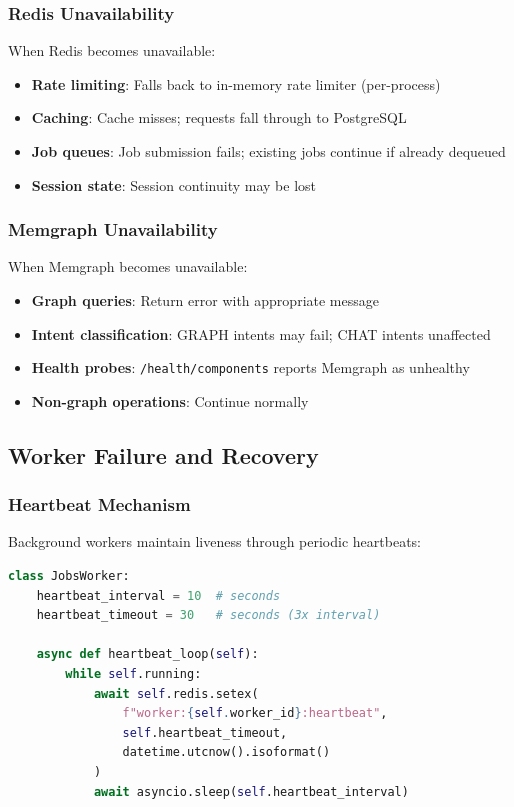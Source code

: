 \subsubsection{Redis Unavailability}

When Redis becomes unavailable:

\begin{itemize}
    \item \textbf{Rate limiting}: Falls back to in-memory rate limiter (per-process)
    \item \textbf{Caching}: Cache misses; requests fall through to PostgreSQL
    \item \textbf{Job queues}: Job submission fails; existing jobs continue if already dequeued
    \item \textbf{Session state}: Session continuity may be lost
\end{itemize}

\subsubsection{Memgraph Unavailability}

When Memgraph becomes unavailable:

\begin{itemize}
    \item \textbf{Graph queries}: Return error with appropriate message
    \item \textbf{Intent classification}: GRAPH intents may fail; CHAT intents unaffected
    \item \textbf{Health probes}: \texttt{/health/components} reports Memgraph as unhealthy
    \item \textbf{Non-graph operations}: Continue normally
\end{itemize}

\subsection{Worker Failure and Recovery}

\subsubsection{Heartbeat Mechanism}

Background workers maintain liveness through periodic heartbeats:

\begin{lstlisting}[language=Python,caption={Worker heartbeat mechanism.}]
class JobsWorker:
    heartbeat_interval = 10  # seconds
    heartbeat_timeout = 30   # seconds (3x interval)
    
    async def heartbeat_loop(self):
        while self.running:
            await self.redis.setex(
                f"worker:{self.worker_id}:heartbeat",
                self.heartbeat_timeout,
                datetime.utcnow().isoformat()
            )
            await asyncio.sleep(self.heartbeat_interval)
\end{lstlisting}

